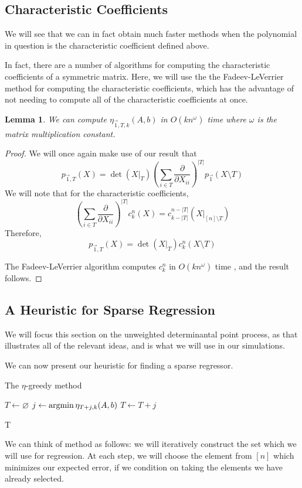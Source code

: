 \documentclass{amsart}
\newtheorem{lemma}[thm]{Lemma}
\theoremstyle{definition}
\numberwithin{equation}{section}
\begin{document}
\subsection{Characteristic Coefficients}
We will see that we can in fact obtain much faster methods when the polynomial in question is the characteristic coefficient defined above.

In fact, there are a number of algorithms for computing the characteristic coefficients of a symmetric matrix.
Here, we will use the the Fadeev-LeVerrier method for computing the characteristic coefficients, which has the advantage of not needing to compute all of the characteristic coefficients at once.
\begin{lemma}
    We can compute  $\eta_{\vec{1}, T, k}(A, b)$ in $O(kn^{\omega})$ time where $\omega$ is the matrix multiplication constant.
\end{lemma}
\begin{proof}
We will once again make use of our result that
\[
    p_{\vec{1}, T}(X) = \det(X|_T) \left( \sum_{i \in T} \frac{\partial}{\partial X_{ii}} \right)^{|T|}p_{\vec{1}}(X \setminus T) 
\]
We will note that for the characteristic coefficients,
\[
    \left( \sum_{i \in T} \frac{\partial}{\partial X_{ii}} \right)^{|T|}c_k^n(X)  = c_{k-|T|}^{n-|T|}(X|_{[n] \setminus T})
\]
Therefore, 
\[
    p_{\vec{1}, T}(X) = \det(X|_T) c_k^n(X \setminus T) 
\]

The Fadeev-LeVerrier algorithm computes $c_k^n$ in $O(kn^{\omega})$ time \cite{bar2021faddeev}, and the result follows.
\end{proof}

\subsection{A Heuristic for Sparse Regression}
We will focus this section on the unweighted determinantal point process, as that illustrates all of the relevant ideas, and is what we will use in our simulations.

We can now present our heuristic for finding a sparse regressor.
\begin{algorithm}
    \caption{The $\eta$-greedy method}
    \begin{algorithmic}\label{alg:greedy}
        \State $T \gets \varnothing$
            \State $j \gets \operatorname*{argmin} \eta_{T+j, k}(A,b)$
            \State $T \gets T + j$
        \EndFor

        \Return T
    \end{algorithmic}
\end{algorithm}
We can think of method as follows: we will iteratively construct the set which we will use for regression.
At each step, we will choose the element from $[n]$ which minimizes our expected error, if we condition on taking the elements we have already selected.
\end{document}
